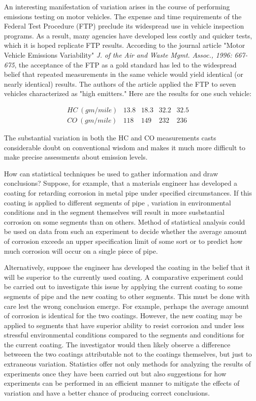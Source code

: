 \documentclass[]{book}
\begin{document}
An interesting manifestation of variation arises in the course of performing emissions testing on motor vehicles. The expense and time requirements of the Federal Test Procedure (FTP) preclude its widespread use in vehicle inspection programs. As a result, many agencies have developed less costly and quicker tests, which it is hoped replicate FTP results. According to the journal article "Motor Vehicle Emissions Variability" \emph{J. of the Air and Waste Mgmt. Assoc., 1996: 667-675}, the acceptance of the FTP as a gold standard has led to the widespread belief that repeated measurements in the same vehicle would yield identical (or nearly identical) results. The authors of the article applied the FTP to seven vehicles characterized as "high emitters." Here are the results for one such vehicle:

\begin{center}\[
    \begin{array}{ccccc}
         HC \ (gm/mile) & 13.8 & 18.3 & 32.2 & 32.5\\
         CO \ (gm/mile) & 118 & 149 & 232 & 236
    \end{array}\]
\end{center}


The substantial variation in both the HC and CO measurements casts considerable doubt on conventional wisdom and makes it much more difficult to make precise assessments about emission levels.

How can statistical techniques be used to gather information and draw conclusions? Suppose, for example, that a materials engineer has developed a coating for retarding corrosion in metal pipe under specified circumstances. If this coating is applied to different segments of pipe , variation in environmental conditions and in the segment themselves will result in more susbstantial corrosion on some segments than on others. Method of statistical analysis could be used on data from such an experiment to decide whether the average amount of corrosion exceeds an upper specification limit of some sort or to predict how much corrosion will occur on a single piece of pipe. 

Alternatively, suppose the engineer has developed the coating in the belief that it will be superior to the currently used coating. A comparative experiment could be carried out to investigate this issue by applying the current coating to some segments of pipe and the new coating to other segments. This must be done with care lest the wrong conclusion emerge. For example, perhaps the average amount of corrosion is identical for the two coatings. However, the new coating may be applied to segments that have superior ability to resist corrosion and under less stressful environmental conditions compared to the segments and conditions for the current coating. The investigator would then likely observe a difference betweeen the two coatings attributable not to the coatings themselves, but just to extraneous variation. Statistics offer not only methods for analyzing the results of experiments once they have been carried out but also suggestions for how experiments can be performed in an efficient manner to mitigate the effects of variation and have a better chance of producing correct conclusions. 
\end{document}
